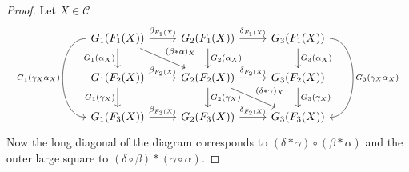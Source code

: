 \begin{proof}
    Let $ X \in \mathcal{ C } $ 
    \[
    \begin{tikzcd}
        G_1 ( F_1 ( X ) ) 
        \ar[r, " \beta_ {F_1 ( X ) }"]
        \ar[rd, " ( \beta * \alpha )_X "]
        \ar[d, " G_1 (\alpha_X ) "']
        \ar[dd, bend right=90, " G_1 ( \gamma_X \alpha_X ) "']
        &
        G_2 ( F_1 ( X ) ) 
        \ar[d, " G_2 ( \alpha_X ) "]
        \ar[r, " \delta_{ F_1 ( X ) }"]
        &
        G_3 ( F_1 ( X ) ) 
        \ar[dd, bend left =90, " G_3 ( \gamma_X \alpha_X ) "]
        \ar[ d , " G_3 ( \alpha_X ) "]
        \\
        G_1 ( F_2 ( X ) ) 
        \ar[d, " G_1 ( \gamma_X )"']
        \ar[r, " \beta_{ F_2 ( X ) }"]
        &
        G_2 ( F_2 ( X ) ) 
        \ar[r, " \delta_{ F_2 ( X ) }"]
        \ar[d, " G_2 ( \gamma_X ) "]
        \ar[rd, " ( \delta * \gamma )_X "]
        &
        G_3 ( F_2 ( X ) ) 
        \ar[d, " G_3 ( \gamma_X ) "]
        \\
        G_1 ( F_3 ( X ) ) 
        \ar[r, " \beta_{ F_3 ( X ) }"]
        &
        G_2 ( F_3 ( X ) )
        \ar[r , " \delta_{F_2 ( X ) }"]
        &
        G_3 ( F_3 ( X ) ) 
    \end{tikzcd}
    \]
    Now the long diagonal of the diagram corresponds to $ ( \delta * \gamma ) \circ ( \beta * \alpha ) $ and the outer large square to $ ( \delta \circ \beta ) * ( \gamma \circ \alpha )$.
\end{proof}

